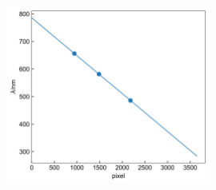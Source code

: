 \documentclass[12pt]{article}
\begin{document}
\vbox{}

\vbox{}

\begin{figure}[h]
	\centering
	\includegraphics[width=0.6\textwidth]{3.jpg}
\end{figure}
\par
\end{document}
